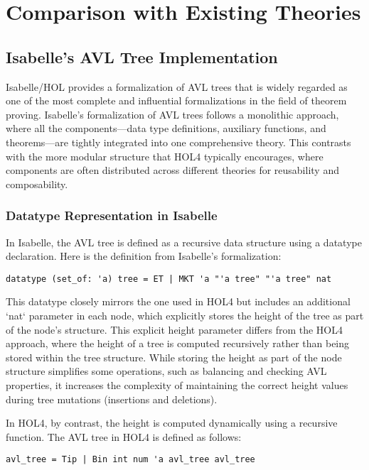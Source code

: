 \documentclass[12pt]{article}
\begin{document}
\section{Comparison with Existing Theories}

\subsection{Isabelle’s AVL Tree Implementation}

Isabelle/HOL \cite{IsabelleAVL} provides a formalization of AVL trees that is widely regarded as one of the most complete and influential formalizations in the field of theorem proving. Isabelle's formalization of AVL trees follows a monolithic approach, where all the components—data type definitions, auxiliary functions, and theorems—are tightly integrated into one comprehensive theory. This contrasts with the more modular structure that HOL4 typically encourages, where components are often distributed across different theories for reusability and composability.

\subsubsection{Datatype Representation in Isabelle}
In Isabelle, the AVL tree is defined as a recursive data structure using a datatype declaration. Here is the definition from Isabelle’s formalization:

\begin{verbatim}
datatype (set_of: 'a) tree = ET | MKT 'a "'a tree" "'a tree" nat
\end{verbatim}

This datatype closely mirrors the one used in HOL4 but includes an additional `nat` parameter in each node, which explicitly stores the height of the tree as part of the node’s structure. This explicit height parameter differs from the HOL4 approach, where the height of a tree is computed recursively rather than being stored within the tree structure. While storing the height as part of the node structure simplifies some operations, such as balancing and checking AVL properties, it increases the complexity of maintaining the correct height values during tree mutations (insertions and deletions).

In HOL4, by contrast, the height is computed dynamically using a recursive function. The AVL tree in HOL4 is defined as follows:

\begin{verbatim}
avl_tree = Tip | Bin int num 'a avl_tree avl_tree
\end{verbatim}
\end{document}
